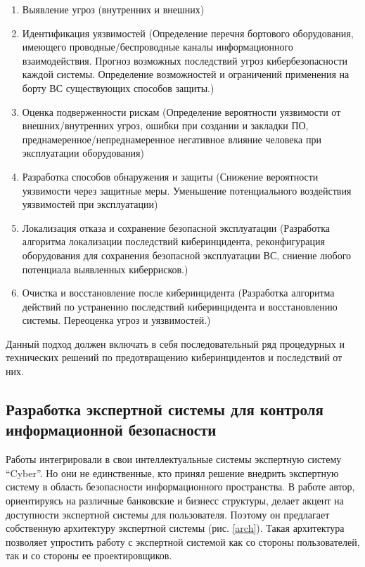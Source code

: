 \begin{enumerate}
\item
Выявление угроз (внутренних и внешних)
\item
Идентификация уязвимостей (Определение перечня бортового оборудования, имеющего проводные/беспроводные каналы
информационного взаимодействия. Прогноз возможных последствий угроз кибербезопасности каждой системы.
Определение возможностей и ограничений применения на борту ВС существующих способов защиты.)
\item
Оценка подверженности рискам (Определение вероятности уязвимости от внешних/внутренних угроз,
ошибки при создании и закладки ПО, преднамеренное/непреднамеренное негативное влияние
человека при эксплуатации оборудования)
\item
Разработка способов обнаружения и защиты (Снижение вероятности уязвимости через защитные меры. Уменьшение
потенциального воздействия уязвимостей при эксплуатации)
\item
Локализация отказа и сохранение безопасной эксплуатации (Разработка алгоритма локализации последствий
киберинцидента, реконфигурация оборудования для сохранения безопасной эксплуатации ВС, сниение любого потенциала
выявленных киберрисков.)
\item
Очистка и восстановление после киберинцидента (Разработка алгоритма действий по устранению последствий
киберинцидента и восстановлению системы. Переоценка угроз и уязвимостей.)
\end{enumerate}

Данный подход должен включать в себя последовательный ряд процедурных
и технических решений по предотвращению киберинцидентов и последствий от них.

\subsection{Разработка экспертной системы для контроля информационной безопасности}
Работы \cite{scheme, ontoling} интегрировали в свои интеллектуальные системы экспертную систему ``Cyber''.
Но они не единственные, кто принял решение внедрить экспертную систему в область безопасности информационного
пространства. В работе \cite{idea} автор, ориентируясь на различные банковские и бизнесс структуры, делает акцент на
доступности экспертной системы для пользователя. Поэтому он предлагает собственную архитектуру экспертной системы
(рис. \ref{arch}). Такая архитектура позволяет упростить работу с экспертной системой как со стороны пользователей,
так и со стороны ее проектировщиков.

